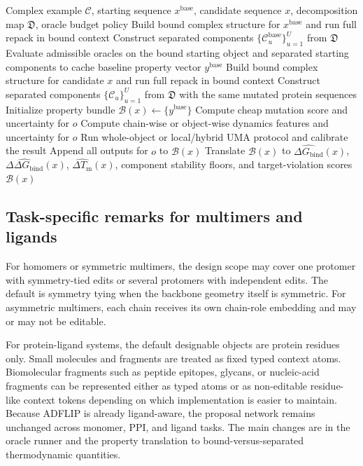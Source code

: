\documentclass[11pt]{article}
\newcommand{\Tm}{\ensuremath{T_{\mathrm m}}}
\newcommand{\ddGbind}{\ensuremath{\Delta\Delta G_{\mathrm{bind}}}}
\newcommand{\dGbind}{\ensuremath{\Delta G_{\mathrm{bind}}}}
\newcommand{\Cx}{\mathcal{C}}
\begin{document}
	\begin{algorithm}[H]
		\caption{Complex and component oracle runner}
		\label{alg:complexrunner}
		\begin{algorithmic}[1]
			\Require Complex example $\Cx$, starting sequence $x^{\mathrm{base}}$, candidate sequence $x$, decomposition map $\mathfrak{D}$, oracle budget policy
			\State Build bound complex structure for $x^{\mathrm{base}}$ and run full repack in bound context
			\State Construct separated components $\{\Cx_u^{\mathrm{base}}\}_{u=1}^{U}$ from $\mathfrak{D}$
			\State Evaluate admissible oracles on the bound starting object and separated starting components to cache baseline property vector $y^{\mathrm{base}}$
			\State Build bound complex structure for candidate $x$ and run full repack in bound context
			\State Construct separated components $\{\Cx_u\}_{u=1}^{U}$ from $\mathfrak{D}$ with the same mutated protein sequences
			\State Initialize property bundle $\mathcal{B}(x) \leftarrow \{y^{\mathrm{base}}\}$
			\State Compute cheap mutation score and uncertainty for $o$
			\EndIf
			\State Compute chain-wise or object-wise dynamics features and uncertainty for $o$
			\EndIf
			\State Run whole-object or local/hybrid UMA protocol and calibrate the result
			\EndIf
			\State Append all outputs for $o$ to $\mathcal{B}(x)$
			\EndFor
			\State Translate $\mathcal{B}(x)$ to $\widehat{\dGbind}(x)$, $\widehat{\ddGbind}(x)$, $\widehat{\Delta \Tm}(x)$, component stability floors, and target-violation scores
			\State \Return $\mathcal{B}(x)$
		\end{algorithmic}
	\end{algorithm}
	
	
	
	\subsection{Task-specific remarks for multimers and ligands}
	
	For homomers or symmetric multimers, the design scope may cover one protomer with symmetry-tied edits or several protomers with independent edits. The default is symmetry tying when the backbone geometry itself is symmetric. For asymmetric multimers, each chain receives its own chain-role embedding and may or may not be editable.
	
	For protein-ligand systems, the default designable objects are protein residues only. Small molecules and fragments are treated as fixed typed context atoms. Biomolecular fragments such as peptide epitopes, glycans, or nucleic-acid fragments can be represented either as typed atoms or as non-editable residue-like context tokens depending on which implementation is easier to maintain. Because ADFLIP is already ligand-aware, the proposal network remains unchanged across monomer, PPI, and ligand tasks. The main changes are in the oracle runner and the property translation to bound-versus-separated thermodynamic quantities.
	
\end{document}
